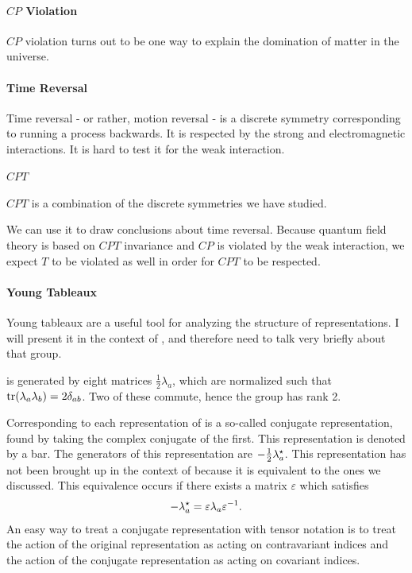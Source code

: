 \paragraph{$CP$ Violation}
$CP$ violation turns out to be one way to explain the domination of matter in the universe.

\paragraph{Time Reversal}
Time reversal - or rather, motion reversal - is a discrete symmetry corresponding to running a process backwards. It is respected by the strong and electromagnetic interactions. It is hard to test it for the weak interaction.

\paragraph{$CPT$}
$CPT$ is a combination of the discrete symmetries we have studied.

We can use it to draw conclusions about time reversal. Because quantum field theory is based on $CPT$ invariance and $CP$ is violated by the weak interaction, we expect $T$ to be violated as well in order for $CPT$ to be respected.

\paragraph{Young Tableaux}
Young tableaux are a useful tool for analyzing the structure of representations. I will present it in the context of , and therefore need to talk very briefly about that group.

 is generated by eight matrices $\frac{1}{2}\lambda_{a}$, which are normalized such that $\tr(\lambda_{a}\lambda_{b}) = 2\delta_{ab}$. Two of these commute, hence the group has rank 2.

Corresponding to each representation of  is a so-called conjugate representation, found by taking the complex conjugate of the first. This representation is denoted by a bar. The generators of this representation are $-\frac{1}{2}\lambda_{a}^{\star}$. This representation has not been brought up in the context of  because it is equivalent to the ones we discussed. This equivalence occurs if there exists a matrix $\varepsilon$ which satisfies
\begin{align*}
	-\lambda_{a}^{\star} = \varepsilon\lambda_{a}\varepsilon^{-1}.
\end{align*}
An easy way to treat a conjugate representation with tensor notation is to treat the action of the original representation as acting on contravariant indices and the action of the conjugate representation as acting on covariant indices.

